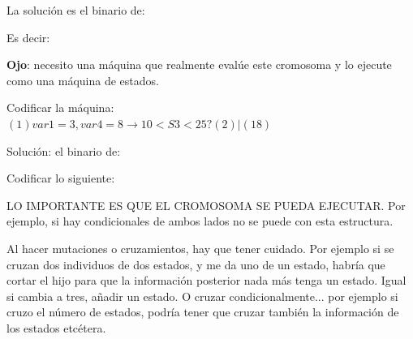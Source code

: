 La solución es el binario de:

Es decir: 


\textbf{Ojo}: necesito una máquina que realmente evalúe este cromosoma y lo ejecute como una máquina de estados.

\begin{ejemplo}
	Codificar la máquina: \\
	$ (1) var1 = 3, var4 = 8 \rightarrow 10 < S3 < 25 ? (2) | (18)$
\end{ejemplo}

Solución: el binario de:


\begin{ejemplo}
Codificar lo siguiente:
\end{ejemplo}


\begin{nota}
LO IMPORTANTE ES QUE EL CROMOSOMA SE PUEDA EJECUTAR. Por ejemplo, si hay
condicionales de ambos lados no se puede con esta estructura.
\end{nota}

\begin{nota}
	Al hacer mutaciones o cruzamientos, hay que tener cuidado. Por ejemplo si se cruzan dos individuos
	de dos estados, y me da uno de un estado, habría que cortar el hijo para que la información posterior nada
	más tenga un estado. Igual si cambia a tres, añadir un estado. O cruzar condicionalmente... por ejemplo si
	cruzo el número de estados, podría tener que cruzar también la información de los estados etcétera.
\end{nota}

